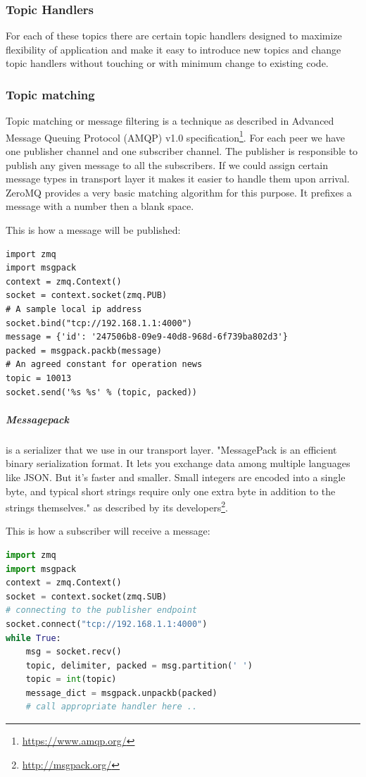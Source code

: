 \subsubsection{Topic  Handlers}
For each of these topics there are certain topic handlers designed to maximize flexibility of application and
make it easy to introduce new topics and change topic handlers without touching or with minimum change to existing code.

\subsubsection{Topic matching}
Topic matching or message filtering is a technique as described 
in Advanced Message Queuing Protocol (AMQP) v1.0 specification\footnote{\url{https://www.amqp.org/}}.
For each peer we have one publisher channel and one subscriber channel. 
The publisher is responsible to publish any given message to all the subscribers.
If we could assign certain message types in transport layer it makes it easier
to handle them upon arrival. 
ZeroMQ provides a very basic matching algorithm for this purpose.
It prefixes a message with a number then a blank space. 

This is how a message will be published:
\begin{lstlisting}[caption={Message publisher code}]
import zmq
import msgpack
context = zmq.Context()
socket = context.socket(zmq.PUB)
# A sample local ip address
socket.bind("tcp://192.168.1.1:4000") 
message = {'id': '247506b8-09e9-40d8-968d-6f739ba802d3'}
packed = msgpack.packb(message)
# An agreed constant for operation news
topic = 10013
socket.send('%s %s' % (topic, packed))
\end{lstlisting}

\subparagraph{Messagepack} is a serializer that we use in our transport layer. 
"MessagePack is an efficient binary serialization format. 
It lets you exchange data among multiple languages like JSON.
But it's faster and smaller. 
Small integers are encoded into a single byte, 
and typical short strings require only one extra byte in addition to the strings themselves."
as described by its developers\footnote{\url{http://msgpack.org/}}.

This is how a subscriber will receive a message:
\begin{lstlisting}[language=python, caption={Subscriber receives and unpacks a message}]
import zmq
import msgpack
context = zmq.Context()
socket = context.socket(zmq.SUB)
# connecting to the publisher endpoint
socket.connect("tcp://192.168.1.1:4000")
while True:
    msg = socket.recv()
    topic, delimiter, packed = msg.partition(' ')
    topic = int(topic)
    message_dict = msgpack.unpackb(packed)
    # call appropriate handler here ..
\end{lstlisting}

